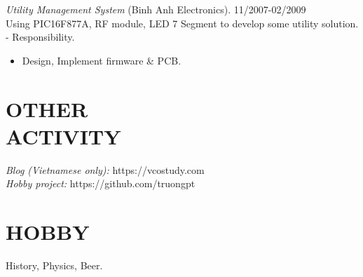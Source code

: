 \documentclass[margin]{res}
\begin{document}
\begin{resume}
                {\sl Utility Management System} (Binh Anh Electronics). \hfill        11/2007-02/2009 \\
                Using PIC16F877A, RF module, LED 7 Segment to develop some utility solution.\\
		- Responsibility.
                \begin{itemize}
                \item Design, Implement firmware \& PCB.
                \end{itemize} 
 
\section{OTHER \\ ACTIVITY}  
		{\sl Blog (Vietnamese only):} https://vcostudy.com \\
		{\sl Hobby project:} https://github.com/truongpt

\section{HOBBY}  History, Physics, Beer.


\end{resume}
\end{document}
